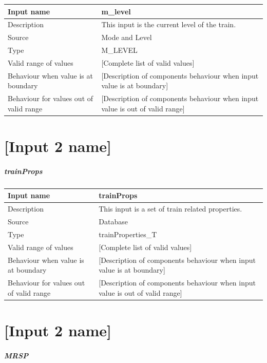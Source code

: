 \begin{longtable}{p{}p{}}
\toprule
Input name				& m\_level \\
\midrule
Description				& This input is the current level of the train. \\
\midrule
Source					& Mode and Level \\ 
\midrule
Type					& M\_LEVEL \\
\midrule
Valid range of values	& [Complete list of valid values] \\
\midrule
Behaviour when value is at boundary	& [Description of components behaviour when input value is at boundary] \\
\midrule
Behaviour for values out of valid range	& [Description of components behaviour when input value is out of valid range] \\
\bottomrule
\end{longtable}\chapter{[Input 2 name]}

\paragraph{trainProps}

\begin{longtable}{p{}p{}}
\toprule
Input name				& trainProps \\
\midrule
Description				& This input is a set of train related properties. \\
\midrule
Source					& Database \\ 
\midrule
Type					& trainProperties\_T \\
\midrule
Valid range of values	& [Complete list of valid values] \\
\midrule
Behaviour when value is at boundary	& [Description of components behaviour when input value is at boundary] \\
\midrule
Behaviour for values out of valid range	& [Description of components behaviour when input value is out of valid range] \\
\bottomrule
\end{longtable}\chapter{[Input 2 name]}


\paragraph{MRSP}

